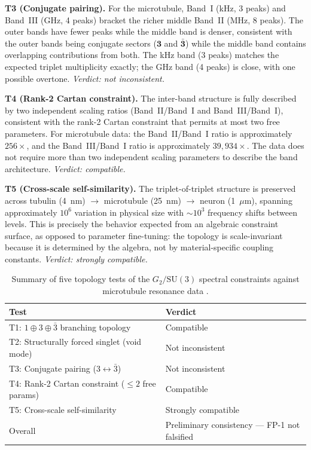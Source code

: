 \documentclass[12pt,a4paper]{article}
\begin{document}
\textbf{T3 (Conjugate pairing).} For the microtubule, Band~I (kHz, 3 peaks) and Band~III (GHz, 4 peaks) bracket the richer middle Band~II (MHz, 8 peaks). The outer bands have fewer peaks while the middle band is denser, consistent with the outer bands being conjugate sectors ($\mathbf{3}$ and $\bar{\mathbf{3}}$) while the middle band contains overlapping contributions from both. The kHz band (3 peaks) matches the expected triplet multiplicity exactly; the GHz band (4 peaks) is close, with one possible overtone. \textit{Verdict: not inconsistent.}

\textbf{T4 (Rank-2 Cartan constraint).} The inter-band structure is fully described by two independent scaling ratios (Band~II/Band~I and Band~III/Band~I), consistent with the rank-2 Cartan constraint that permits at most two free parameters. For microtubule data: the Band~II/Band~I ratio is approximately $256\times$, and the Band~III/Band~I ratio is approximately $39{,}934\times$. The data does not require more than two independent scaling parameters to describe the band architecture. \textit{Verdict: compatible.}

\textbf{T5 (Cross-scale self-similarity).} The triplet-of-triplet structure is preserved across tubulin (4~nm) $\to$ microtubule (25~nm) $\to$ neuron (1~$\mu$m), spanning approximately $10^6$ variation in physical size with ${\sim}10^3$ frequency shifts between levels. This is precisely the behavior expected from an algebraic constraint surface, as opposed to parameter fine-tuning: the topology is scale-invariant because it is determined by the algebra, not by material-specific coupling constants. \textit{Verdict: strongly compatible.}

\begin{table}[ht]
\centering
\caption{Summary of five topology tests of the $G_2/\mathrm{SU}(3)$ spectral constraints against microtubule resonance data \citep{Sahu2013,Singh2014,Saxena2020}.}
\label{tab:topology-tests}
\small
\begin{tabular}{@{}ll@{}}
\toprule
Test & Verdict \\
\midrule
T1: $1 \oplus 3 \oplus \bar{3}$ branching topology & Compatible \\
T2: Structurally forced singlet (void mode) & Not inconsistent \\
T3: Conjugate pairing ($3 \leftrightarrow \bar{3}$) & Not inconsistent \\
T4: Rank-2 Cartan constraint ($\leq 2$ free params) & Compatible \\
T5: Cross-scale self-similarity & Strongly compatible \\
\midrule
Overall & Preliminary consistency --- FP-1 not falsified \\
\bottomrule
\end{tabular}
\end{table}
\end{document}

